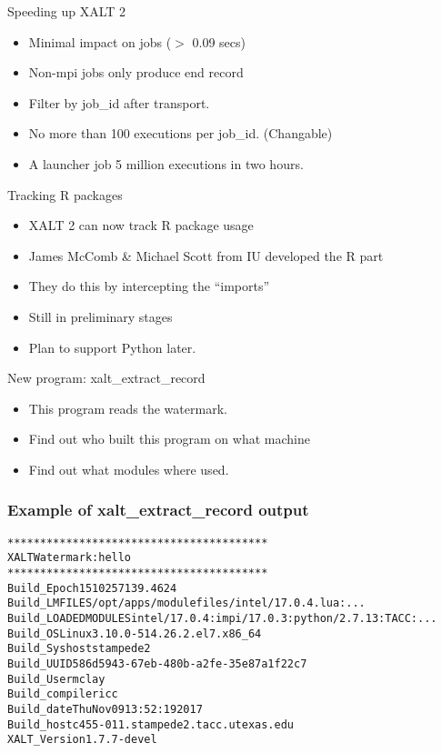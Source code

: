 \documentclass{beamer}
\begin{document}
\begin{frame}{Speeding up XALT 2}
  \begin{itemize}
    \item Minimal impact on jobs ($>$ 0.09 secs)
    \item Non-mpi jobs only produce end record
    \item Filter by job\_id after transport.
    \item No more than 100 executions per job\_id.  (Changable)
    \item A launcher job 5 million executions in two hours.
  \end{itemize}
\end{frame}

\begin{frame}{Tracking R packages}
  \begin{itemize}
    \item XALT 2 can now track R package usage
    \item James McComb \& Michael Scott from IU developed the R part
    \item They do this by intercepting the ``imports''
    \item Still in preliminary stages
    \item Plan to support Python later.
  \end{itemize}
\end{frame}

\begin{frame}{New program: xalt\_extract\_record}
  \begin{itemize}
    \item This program reads the watermark.
    \item Find out who built this program on what machine
    \item Find out what modules where used.
  \end{itemize}
\end{frame}

\begin{frame}[fragile]
    \frametitle{Example of xalt\_extract\_record output}
 {\small
    \begin{alltt}
****************************************
XALT Watermark: hello
****************************************
Build_Epoch              1510257139.4624
Build_LMFILES            /opt/apps/modulefiles/intel/17.0.4.lua:...
Build_LOADEDMODULES      intel/17.0.4:impi/17.0.3:python/2.7.13:TACC:...
Build_OS                 Linux 3.10.0-514.26.2.el7.x86_64
Build_Syshost            stampede2
Build_UUID               586d5943-67eb-480b-a2fe-35e87a1f22c7
Build_User               mclay
Build_compiler           icc
Build_date               Thu Nov 09 13:52:19 2017
Build_host               c455-011.stampede2.tacc.utexas.edu
XALT_Version             1.7.7-devel
    \end{alltt}
}
\end{frame}
\end{document}
